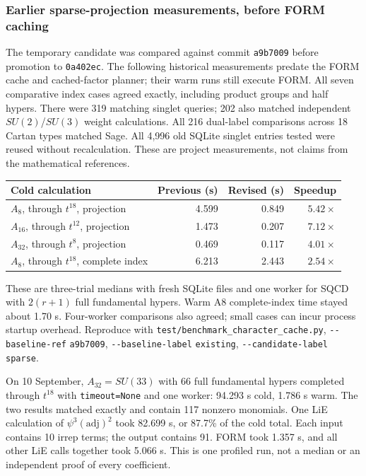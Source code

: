 \documentclass[11pt,a4paper]{article}
\numberwithin{equation}{section}
\newcommand{\code}[1]{{\small\nolinkurl{#1}}}
\newcommand{\adj}{\mathrm{adj}}
\begin{document}
\clearpage
\subsubsection{Earlier sparse-projection measurements, before FORM caching}
The temporary candidate was compared against commit \code{a9b7009} before
promotion to \code{0a402ec}. The following historical measurements predate the
FORM cache and cached-factor planner; their warm runs still execute FORM.
All seven comparative index cases agreed exactly, including product groups and
half hypers. There were 319 matching singlet queries; 202 also matched independent
$SU(2)$/$SU(3)$ weight calculations. All 216 dual-label comparisons across 18
Cartan types matched Sage. All 4,996 old SQLite singlet entries tested were reused
without recalculation. These are project measurements, not claims from the
mathematical references.

\begin{tabularx}{\textwidth}{@{}Yrrr@{}}
\toprule Cold calculation & Previous (s) & Revised (s) & Speedup\\\midrule
$A_8$, through $t^{18}$, projection & 4.599 & 0.849 & $5.42\times$\\
$A_{16}$, through $t^{12}$, projection & 1.473 & 0.207 & $7.12\times$\\
$A_{32}$, through $t^8$, projection & 0.469 & 0.117 & $4.01\times$\\
$A_8$, through $t^{18}$, complete index & 6.213 & 2.443 & $2.54\times$\\\bottomrule
\end{tabularx}
These are three-trial medians with fresh SQLite files and one worker for SQCD
with $2(r+1)$ full fundamental hypers. Warm A8 complete-index time stayed about
1.70 s. Four-worker comparisons also agreed; small cases can incur process
startup overhead. Reproduce with \code{test/benchmark_character_cache.py},
\code{--baseline-ref} \code{a9b7009}, \code{--baseline-label} \code{existing},
\code{--candidate-label} \code{sparse}.

On 10 September, $A_{32}=SU(33)$ with 66 full fundamental hypers completed through
$t^{18}$ with \code{timeout=None} and one worker: 94.293 s cold, 1.786 s warm.
The two results matched exactly and contain 117 nonzero monomials. One LiE
calculation of $\psi^3(\adj)^2$ took 82.699 s, or 87.7\% of the cold total.
Each input contains 10 irrep terms; the output contains 91. FORM took 1.357 s,
and all other LiE calls together took 5.066 s. This is one profiled run, not a
median or an independent proof of every coefficient.
\end{document}
